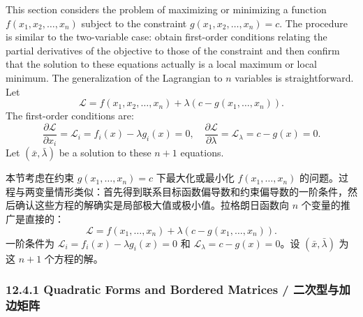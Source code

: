 \begin{original}
This section considers the problem of maximizing or minimizing a function $f(x_1, x_2, \ldots, x_n)$ subject to the constraint $g(x_1, x_2, \ldots, x_n) = c$. The procedure is similar to the two-variable case: obtain first-order conditions relating the partial derivatives of the objective to those of the constraint and then confirm that the solution to these equations actually is a local maximum or local minimum. The generalization of the Lagrangian to $n$ variables is straightforward. Let
\[
\mathcal{L} = f(x_1, x_2, \ldots, x_n) + \lambda(c - g(x_1, \ldots, x_n)).
\]
The first-order conditions are:
\[
\frac{\partial \mathcal{L}}{\partial x_i} = \mathcal{L}_i = f_i(x) - \lambda g_i(x) = 0, \quad \frac{\partial \mathcal{L}}{\partial \lambda} = \mathcal{L}_\lambda = c - g(x) = 0.
\]
Let $(\bar{x}, \bar{\lambda})$ be a solution to these $n+1$ equations.
\end{original}
\begin{translation}
本节考虑在约束 $g(x_1, \ldots, x_n) = c$ 下最大化或最小化 $f(x_1, \ldots, x_n)$ 的问题。过程与两变量情形类似：首先得到联系目标函数偏导数和约束偏导数的一阶条件，然后确认这些方程的解确实是局部极大值或极小值。拉格朗日函数向 $n$ 个变量的推广是直接的：
\[
\mathcal{L} = f(x_1, \ldots, x_n) + \lambda(c - g(x_1, \ldots, x_n)).
\]
一阶条件为 $\mathcal{L}_i = f_i(x) - \lambda g_i(x) = 0$ 和 $\mathcal{L}_\lambda = c - g(x) = 0$。设 $(\bar{x}, \bar{\lambda})$ 为这 $n+1$ 个方程的解。
\end{translation}

\subsubsection{12.4.1 Quadratic Forms and Bordered Matrices / 二次型与加边矩阵}

